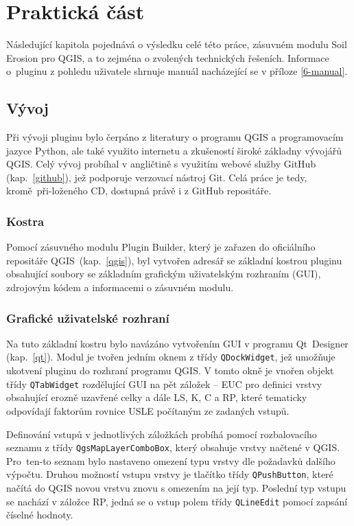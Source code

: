 \chapter{Praktická část}
\label{4-prakticka-cast} Následující kapitola pojednává o výsledku
celé této práce, zásuvném modulu Soil Erosion pro QGIS, a to zejména o
zvolených technických řešeních. Informace o~pluginu z pohledu
uživatele shrnuje manuál nacházející se v příloze \ref{6-manual}.
\section{Vývoj} Při vývoji pluginu bylo čerpáno z literatury o
programu QGIS\cite{masteringQgis} a programovacím jazyce
Python\cite{learningPython}\cite{diveIntoPython}, ale také využito
internetu a zkušeností široké základny vývojářů
QGIS\cite{stackexchange}\cite{qgisuserdiscussion}. Celý vývoj probíhal v angličtině s využitím
webové služby GitHub (kap.~\ref{github}), jež podporuje verzovací
nástroj Git. Celá práce je tedy, kromě~při-loženého CD, dostupná právě
i z GitHub repositáře\cite{mujgithub}.
\subsection{Kostra} Pomocí zásuvného modulu Plugin Builder, který je
zařazen do oficiálního repositáře QGIS~(kap.~\ref{qgis}), byl vytvořen
adresář se základní kostrou pluginu obsahující soubory se základním
grafickým uživatelským rozhraním (GUI), zdrojovým kódem a informacemi
o zásuvném modulu.
\subsection{Grafické uživatelské rozhraní} Na tuto základní kostru
bylo navázáno vytvořením GUI v programu
Qt~Designer (kap.~\ref{qt}). Modul je tvořen jedním oknem z třídy
\texttt{QDockWidget}, jež umožňuje ukotvení pluginu do rozhraní
programu QGIS. V tomto okně je vnořen objekt třídy \texttt{QTabWidget}
rozdělující GUI na pět záložek – EUC pro definici vrstvy obsahující
erozně uzavřené celky a dále LS, K, C a RP, které tematicky odpovídají
faktorům rovnice USLE počítaným ze zadaných vstupů.

Definování vstupů v jednotlivých záložkách probíhá pomocí
rozbalovacího seznamu z třídy \texttt{QgsMapLayerComboBox}, který
obsahuje vrstvy načtené v QGIS. Pro~ten-to seznam bylo nastaveno
omezení typu vrstvy dle požadavků dalšího výpočtu.  Druhou možností
vstupu vrstvy je tlačítko třídy \texttt{QPushButton}, které načítá do
QGIS novou vrstvu znovu s omezením na její typ. Poslední typ vstupu se
nachází v záložce RP, jedná se o vstup polem třídy
\texttt{QLineEdit} pomocí zapsání číselné hodnoty.

